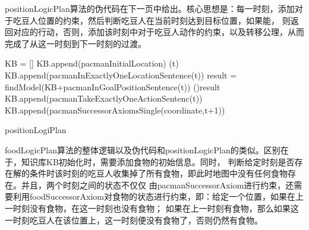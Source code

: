positionLogicPlan算法的伪代码在下一页中给出。核心思想是：每一时刻，添加对于吃豆人位置的约束，然后判断吃豆人在当前时刻达到目标位置，如果能，
则返回对应的行动，否则，添加该时刻中对于吃豆人动作的约束，以及转移公理，从而完成了从这一时刻到下一时刻的过渡。

\begin{algorithm}
    KB = []\;
    KB.append(pacmanInitialLocation)\;
    {
        \print(t)\;
        KB.append(pacmanInExactlyOneLocationSentence(t))\;
        result = findModel(KB+pacmanInGoalPositionSentence(t))\;
        \If(){result}{}
        KB.append(pacmanTakeExactlyOneActionSentenc(t))\;
        {
        KB.append(pacmanSuccessorAxiomsSingle(coordinate,t+1))\;
        }
    }
    \caption{positionLogiPlan}
\end{algorithm}


foodLogicPlan算法的整体逻辑以及伪代码和positionLogicPlan的类似。区别在于，知识库KB初始化时，需要添加食物的初始信息。同时，
判断给定时刻是否存在解的条件时该时刻的吃豆人收集掉了所有食物，即此时地图中没有任何食物存在。并且，两个时刻之间的状态不仅仅
由pacmanSuccessorAxiom进行约束，还需要利用foodSuccessorAxiom对食物的状态进行约束，即：给定一个位置，如果在上一时刻没有食物，在这一时刻也没有食物；
如果在上一时刻有食物，那么如果这一时刻吃豆人在该位置上，这一时刻便没有食物了，否则仍然有食物。

